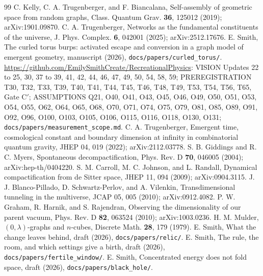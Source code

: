 \documentclass[aps,pre,10pt,twocolumn,superscriptaddress,nofootinbib]{revtex4-2}
\begin{document}
\begin{thebibliography}{99}
 C. Kelly, C. A. Trugenberger, and F. Biancalana, Self-assembly of geometric space from random
graphs, Class. Quantum Grav. \textbf{36}, 125012 (2019); arXiv:1901.09870.
 C. A. Trugenberger, Networks as the fundamental constituents of the universe, J. Phys. Complex.
\textbf{6}, 042001 (2025); arXiv:2512.17676.
 E. Smith, The curled torus burps: activated escape and conversion in a graph model of emergent
geometry, manuscript (2026), \texttt{docs/papers/curled\_torus/}.
 \url{https://github.com/EmilySmithCreate/RecreationalPhysics}: VISION Updates 22 to 25, 30, 37 to 39,
41, 42, 44, 46, 47, 49, 50, 54, 58, 59; PREREGISTRATION T30, T32, T33, T39, T40, T41, T44, T45, T46, T48, T49, T53, T54, T56, T65,
Gate C$'$; ASSUMPTIONS Q21, O40, O41, O43, O45, O46, O49, O50, O51, O53, O54, O55, O62, O64, O65, O68, O70, O71,
O74, O75, O79, O81, O85, O89, O91, O92, O96, O100, O103, O105, O106, O115, O116, O118, O130, O131;
\texttt{docs/papers/measurement\_scope.md}.
 C. A. Trugenberger, Emergent time, cosmological constant and boundary dimension at infinity in
combinatorial quantum gravity, JHEP 04, 019 (2022); arXiv:2112.03778.
 S. B. Giddings and R. C. Myers, Spontaneous decompactification, Phys. Rev. D \textbf{70}, 046005
(2004); arXiv:hep-th/0404220.
 S. M. Carroll, M. C. Johnson, and L. Randall, Dynamical compactification from de Sitter space, JHEP
11, 094 (2009); arXiv:0904.3115.
 J. J. Blanco-Pillado, D. Schwartz-Perlov, and A. Vilenkin, Transdimensional tunneling in the
multiverse, JCAP 05, 005 (2010); arXiv:0912.4082.
 P. W. Graham, R. Harnik, and S. Rajendran, Observing the dimensionality of our parent vacuum, Phys.
Rev. D \textbf{82}, 063524 (2010); arXiv:1003.0236.
 H. M. Mulder, $(0,\lambda)$-graphs and $n$-cubes, Discrete Math. \textbf{28}, 179 (1979).
 E. Smith, What the change leaves behind, draft (2026), \texttt{docs/papers/relic/}.
 E. Smith, The rule, the room, and which settings give a birth, draft (2026),
\texttt{docs/papers/fertile\_window/}.
 E. Smith, Concentrated energy does not fold space, draft (2026),
\texttt{docs/papers/black\_hole/}.
\end{thebibliography}
\end{document}
